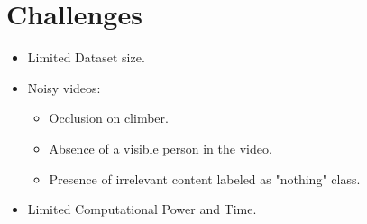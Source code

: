 \section{Challenges}

\begin{frame}

    \vspace{1em}

    \begin{itemize}
        \itemsep1em
        \item Limited Dataset size.
        \item Noisy videos:
        \vspace{1em}
        \begin{itemize}
            \itemsep1em
            \item Occlusion on climber.
            \item Absence of a visible person in the video.
            \item Presence of irrelevant content labeled as "nothing" class.
        \end{itemize}
        \item Limited Computational Power and Time.
    \end{itemize}

    \vspace{1em}
\end{frame}